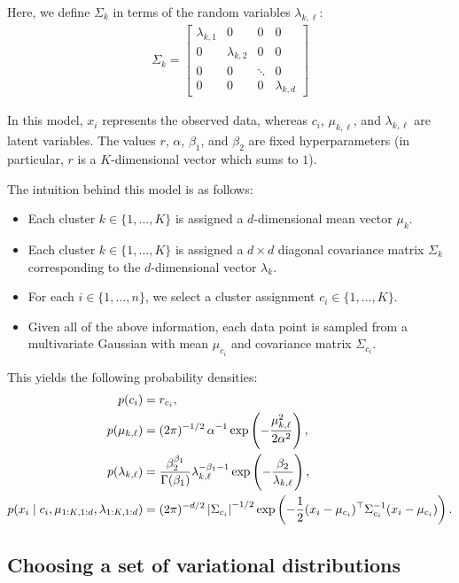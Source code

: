 \documentclass[11pt]{article}
\begin{document}
Here, we define $\Sigma_k$ in terms of the random variables $\lambda_{k,\ell}$:
\begin{align}
\Sigma_k
= \begin{bmatrix}
    \lambda_{k, 1} & 0 & 0 & 0 \\
    0 & \lambda_{k, 2} & 0 & 0 \\
    0 & 0 & \ddots & 0 \\
    0 & 0 & 0 & \lambda_{k, d}
  \end{bmatrix}
\end{align}

In this model, $x_i$ represents the observed data, whereas $c_i$, $\mu_{k, \ell}$, and $\lambda_{k,\ell}$ are latent variables.
The values $r$, $\alpha$, $\beta_1$, and $\beta_2$ are fixed hyperparameters (in particular, $r$ is a $K$-dimensional vector which sums to $1$).

The intuition behind this model is as follows:
\begin{itemize}
    \item Each cluster $k \in \{1, \ldots, K\}$ is assigned a $d$-dimensional mean vector $\mu_k$.
    \item Each cluster $k \in \{1, \ldots, K\}$ is assigned a $d \times d$ diagonal covariance matrix $\Sigma_k$ corresponding to the $d$-dimensional vector $\lambda_k$.
    \item For each $i \in \{1, \ldots, n\}$, we select a cluster assignment $c_i \in \{1, \ldots, K\}$.
    \item Given all of the above information, each data point is sampled from a multivariate Gaussian with mean $\mu_{c_i}$ and covariance matrix $\Sigma_{c_i}$.
\end{itemize}

This yields the following probability densities:
\begin{align}
p(c_i) &= r_{c_i}, \\
p(\mu_{k, \ell}) &= (2\pi)^{-1/2} \, \alpha^{-1} \exp\left( -\frac{\mu_{k, \ell}^2}{2 \alpha^2} \right), \\
p(\lambda_{k,\ell}) &= \frac{\beta_2^{\beta_1}}{\Gamma(\beta_1)} \lambda_{k,\ell}^{-\beta_1 - 1} \exp\left( -\frac{\beta_2}{\lambda_{k,\ell}} \right), \\
p(x_i \mid c_i, \mu_{1:K,1:d}, \lambda_{1:K,1:d}) &= (2\pi)^{-d/2} \, \abs{\Sigma_{c_i}}^{-1/2} \exp \left( -\frac{1}{2} (x_i - \mu_{c_i})^\top \Sigma_{c_i}^{-1} (x_i - \mu_{c_i}) \right).
\end{align}

\subsection{Choosing a set of variational distributions}
\end{document}
